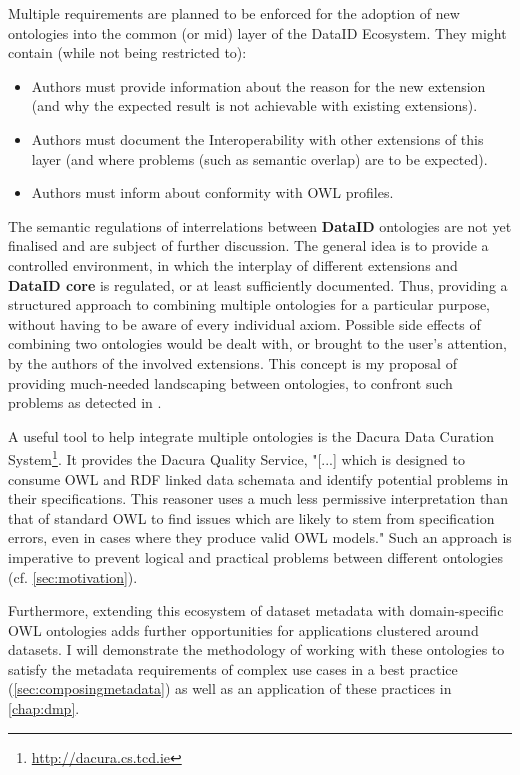 \documentclass[a4paper,english,twoside,BCOR1.5cm,headsepline,DIV12,appendixprefix,final,12pt]{scrbook}
\newcommand{\dataid}{{\ttfamily\bfseries DataID}\xspace}
\newcommand{\core}{{\ttfamily\bfseries DataID core}\xspace}
\newcommand\footnoteurl[1]{\footnote{\scriptsize\url{#1}}}
\begin{document}
Multiple requirements are planned to be enforced for the adoption of new ontologies into the common (or mid) layer of the DataID Ecosystem.
They might contain (while not being restricted to):

\begin{itemize}
\item Authors must provide information about the reason for the new extension (and why the expected result is not achievable with existing extensions).
\item Authors must document the Interoperability with other extensions of this layer (and where problems (such as semantic overlap) are to be expected).
\item Authors must inform about conformity with OWL profiles.
\end{itemize}

The semantic regulations of interrelations between \dataid ontologies are not yet finalised and are subject of further discussion. The general idea is to provide a controlled environment, in which the interplay of different extensions and \core is regulated, or at least sufficiently documented. Thus, providing a structured approach to combining multiple ontologies for a particular purpose, without having to be aware of every individual axiom. Possible side effects of combining two ontologies would be dealt with, or brought to the user's attention, by the authors of the involved extensions. This concept is my proposal of providing much-needed landscaping between ontologies, to confront such problems as detected in \cite{feeney2015linked}.

A useful tool to help integrate multiple ontologies is the Dacura Data Curation System\footnoteurl{http://dacura.cs.tcd.ie}. It provides the Dacura Quality Service, "[...] which is designed to consume OWL and RDF linked data schemata and identify potential problems in their specifications.
This reasoner uses a much less permissive
interpretation than that of standard OWL to find issues
which are likely to stem from specification errors,
even in cases where they produce valid OWL models." \cite{Feeney16} 
Such an approach is imperative to prevent logical and practical problems between different ontologies (cf. \cref{sec:motivation}).

Furthermore, extending this ecosystem of dataset metadata with domain-specific OWL ontologies adds further opportunities for applications clustered around datasets. I will demonstrate the methodology of working with these ontologies to satisfy the metadata requirements of complex use cases in a best practice (\cref{sec:composingmetadata}) as well as an application of these practices in \cref{chap:dmp}.
\end{document}
